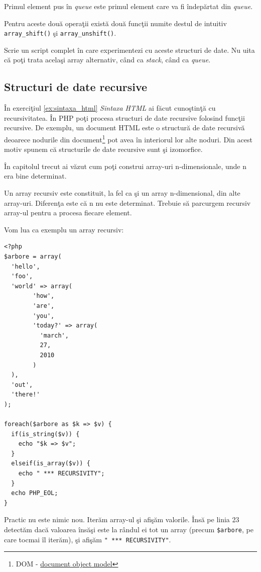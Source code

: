Primul element pus în \textit{queue} este primul
element care va fi îndepărtat din \textsl{queue}.

Pentru aceste două operaţii există două funcţii numite
destul de intuitiv \texttt{array\_shift()} şi
\texttt{array\_unshift()}.



\begin{Exercise}[title={Experimentează cu stack şi queue}]
Scrie un script complet în care experimentezi cu
aceste structuri de date. Nu uita că poţi trata
acelaşi array alternativ, când ca \textit{stack}, când ca \textit{queue}.
\end{Exercise}

\subsection{Structuri de date recursive}
În exerciţiul \ref{ex:sintaxa_html} \textit{Sintaxa HTML} ai
făcut cunoştinţă cu recursivitatea. În PHP poţi procesa
structuri de date recursive folosind funcţii recursive.
De exemplu,
un document HTML este o structură de date recursivă
deoarece nodurile din
document\footnote{DOM - \href{http://en.wikipedia.org/wiki/Document_Object_Model}{document object model}}
pot avea în interiorul lor alte noduri. Din acest motiv
spunem că structurile de date recursive sunt şi izomorfice.

În capitolul trecut ai văzut cum poţi construi array-uri
n-dimensionale, unde n era bine determinat.

Un array recursiv este constituit, la fel ca şi un array
n-dimensional, din alte array-uri. Diferenţa este că
n nu este determinat. Trebuie să parcurgem recursiv
array-ul pentru a procesa fiecare element.


Vom lua ca exemplu un array recursiv:
\begin{lstlisting}
<?php
$arbore = array(
  'hello',
  'foo',
  'world' => array(
        'how',
        'are',
        'you',
        'today?' => array(
          'march',
          27,
          2010
        )
  ),
  'out',
  'there!'
);

foreach($arbore as $k => $v) {
  if(is_string($v)) {
	echo "$k => $v";
  }
  elseif(is_array($v)) {
	echo " *** RECURSIVITY";
  }
  echo PHP_EOL;
}
\end{lstlisting}
Practic nu este nimic nou. Iterăm array-ul şi afişăm
valorile. Însă pe linia 23 detectăm dacă valoarea însăşi
este la rândul ei tot un array (precum \texttt{\$arbore},
pe care tocmai îl iterăm), şi afişăm \texttt{" *** RECURSIVITY"}.

